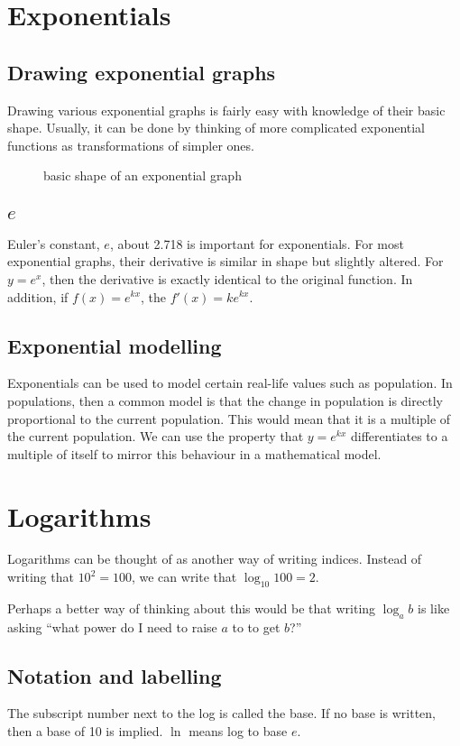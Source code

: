 \section{Exponentials}
\subsection{Drawing exponential graphs}
Drawing various exponential graphs is fairly easy with knowledge of their basic shape. Usually, it can be done by thinking of more complicated exponential functions as transformations of simpler ones.
\begin{figure}[ht]
    \centering
    \caption{basic shape of an exponential graph}
    \label{fig:basic-shape-of-an-exponential-graph}
\end{figure}

\subsection{$e$}
Euler's constant, $e$, about 2.718 is important for exponentials. For most exponential graphs, their derivative is similar in shape but slightly altered. For $y=e^x$, then the derivative is exactly identical to the original function. In addition, if $f(x)=e^{kx}$, the $f'(x)=ke^{kx}$.

\subsection{Exponential modelling}
Exponentials can be used to model certain real-life values such as population. In populations, then a common model is that the change in population is directly proportional to the current population. This would mean that it is a multiple of the current population. We can use the property that $y=e^{kx}$ differentiates to a multiple of itself to mirror this behaviour in a mathematical model.

\section{Logarithms}
Logarithms can be thought of as another way of writing indices. Instead of writing that $10^2=100$, we can write that $\log_{10}100=2$.

Perhaps a better way of thinking about this would be that writing $\log_{a}b$ is like asking ``what power do I need to raise $a$ to to get $b$?''

\subsection{Notation and labelling}
The subscript number next to the log is called the base. If no base is written, then a base of 10 is implied. $\ln$ means log to base $e$.

